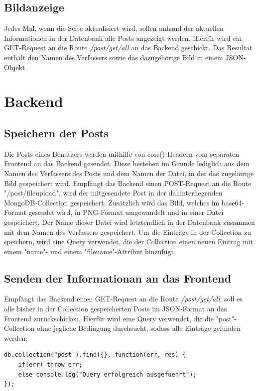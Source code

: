 \documentclass[12pt,a4paper]{report}
\begin{document}
\subsection{Bildanzeige}
Jedes Mal, wenn die Seite aktualisiert wird, sollen anhand der aktuellen Informationen in der Datenbank alle Posts angezeigt werden. Hierfür wird ein GET-Request an die Route \textit{/post/get/all} an das Backend geschickt. Das Resultat enthält den Namen des Verfassers sowie das dazugehörige Bild in einem JSON-Objekt.

\section{Backend}

\subsection{Speichern der Posts}
Die Posts eines Benutzers werden mithilfe von cors()-Headern vom separaten Frontend an das Backend gesendet. Diese bestehen im Grunde lediglich aus dem Namen des Verfassers des Posts und dem Namen der Datei, in der das zugehörige Bild gespeichert wird. Empfängt das Backend einen POST-Request an die Route "/post/fileupload", wird der mitgesendete Post in der dahinterliegenden MongoDB-Collection gespeichert. Zusätzlich wird das Bild, welches im base64-Format gesendet wird, in PNG-Format umgewandelt und in einer Datei gespeichert. Der Name dieser Datei wird letztendlich in der Datenbank zusammen mit dem Namen des Verfassers gespeichert.
Um die Einträge in der Collection zu speichern, wird eine Query verwendet, die der Collection einen neuen Eintrag mit einem "name"- und einem "filename"-Attribut hinzufügt.

\subsection{Senden der Informationan an das Frontend}
Empfängt das Backend einen GET-Request an die Route \textit{/post/get/all}, soll es alle bisher in der Collection gespeicherten Posts im JSON-Format an das Frontend zurückschicken. Hierfür wird eine Query verwendet, die die "post"-Collection ohne jegliche Bedingung durchsucht, sodass alle Einträge gefunden werden:

\begin{verbatim}
db.collection("post").find({}, function(err, res) {
    if(err) throw err;
    else console.log("Query erfolgreich ausgefuehrt");
});
\end{verbatim}
\end{document}

